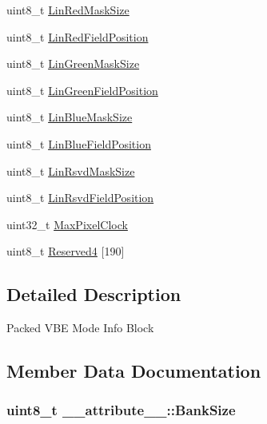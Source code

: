 \begin{DoxyCompactItemize}
\item 
uint8\+\_\+t \hyperlink{struct____attribute_____a88a5ced225c9ef7ed6ffe33e5a39edc6}{Lin\+Red\+Mask\+Size}
\item 
uint8\+\_\+t \hyperlink{struct____attribute_____aec8d45f188ac9210b88216af83de847d}{Lin\+Red\+Field\+Position}
\item 
uint8\+\_\+t \hyperlink{struct____attribute_____a5768a84391f8a26d8a9bfd6a22d5e49d}{Lin\+Green\+Mask\+Size}
\item 
uint8\+\_\+t \hyperlink{struct____attribute_____a5571b1959950d520f2b45bb5549994e3}{Lin\+Green\+Field\+Position}
\item 
uint8\+\_\+t \hyperlink{struct____attribute_____aa2b79b8eed8d842e0db481fb1fbb9a06}{Lin\+Blue\+Mask\+Size}
\item 
uint8\+\_\+t \hyperlink{struct____attribute_____a99e6b6bdbda9f98f2823429dfd5b5685}{Lin\+Blue\+Field\+Position}
\item 
uint8\+\_\+t \hyperlink{struct____attribute_____a577b5892a22d06e230f528a62a472d1d}{Lin\+Rsvd\+Mask\+Size}
\item 
uint8\+\_\+t \hyperlink{struct____attribute_____a012126db503ad1281ae53aa41f4c96a7}{Lin\+Rsvd\+Field\+Position}
\item 
uint32\+\_\+t \hyperlink{struct____attribute_____afd81a69353c35e8b1fb9b696931f79a5}{Max\+Pixel\+Clock}
\item 
uint8\+\_\+t \hyperlink{struct____attribute_____ab859fb715f83f005dfa2f13d8b0e4ff0}{Reserved4} \mbox{[}190\mbox{]}
\end{DoxyCompactItemize}


\subsection{Detailed Description}
Packed V\+BE Mode Info Block 

\subsection{Member Data Documentation}
\subsubsection[{\texorpdfstring{Bank\+Size}{BankSize}}]{\setlength{\rightskip}{0pt plus 5cm}uint8\+\_\+t \+\_\+\+\_\+attribute\+\_\+\+\_\+\+::\+Bank\+Size}\hypertarget{struct____attribute_____aa1307567cbc12f9c5c724b7457be14ad}{}\label{struct____attribute_____aa1307567cbc12f9c5c724b7457be14ad}


